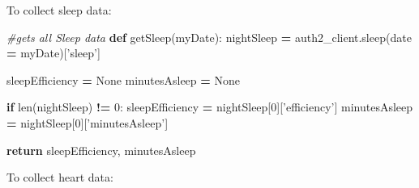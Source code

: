 \documentclass[]{book}
\newenvironment{Shaded}{\begin{snugshade}}{\end{snugshade}}
\newcommand{\KeywordTok}[1]{\textcolor[rgb]{0.13,0.29,0.53}{\textbf{#1}}}
\newcommand{\DecValTok}[1]{\textcolor[rgb]{0.00,0.00,0.81}{#1}}
\newcommand{\StringTok}[1]{\textcolor[rgb]{0.31,0.60,0.02}{#1}}
\newcommand{\CommentTok}[1]{\textcolor[rgb]{0.56,0.35,0.01}{\textit{#1}}}
\newcommand{\VariableTok}[1]{\textcolor[rgb]{0.00,0.00,0.00}{#1}}
\newcommand{\ControlFlowTok}[1]{\textcolor[rgb]{0.13,0.29,0.53}{\textbf{#1}}}
\newcommand{\OperatorTok}[1]{\textcolor[rgb]{0.81,0.36,0.00}{\textbf{#1}}}
\newcommand{\BuiltInTok}[1]{#1}
\newcommand{\NormalTok}[1]{#1}
\begin{document}
To collect sleep data:

\begin{Shaded}
\begin{Highlighting}[]
\CommentTok{#gets all Sleep data}
\KeywordTok{def}\NormalTok{ getSleep(myDate): }
\NormalTok{    nightSleep }\OperatorTok{=}\NormalTok{ auth2_client.sleep(date }\OperatorTok{=}\NormalTok{ myDate)[}\StringTok{'sleep'}\NormalTok{]}
    
\NormalTok{    sleepEfficiency }\OperatorTok{=} \VariableTok{None}
\NormalTok{    minutesAsleep }\OperatorTok{=} \VariableTok{None}
    
    \ControlFlowTok{if} \BuiltInTok{len}\NormalTok{(nightSleep) }\OperatorTok{!=} \DecValTok{0}\NormalTok{:}
\NormalTok{        sleepEfficiency }\OperatorTok{=}\NormalTok{ nightSleep[}\DecValTok{0}\NormalTok{][}\StringTok{'efficiency'}\NormalTok{]}
\NormalTok{        minutesAsleep }\OperatorTok{=}\NormalTok{ nightSleep[}\DecValTok{0}\NormalTok{][}\StringTok{'minutesAsleep'}\NormalTok{]}
        
    \ControlFlowTok{return}\NormalTok{ sleepEfficiency, minutesAsleep}
\end{Highlighting}
\end{Shaded}

To collect heart data:
\end{document}
